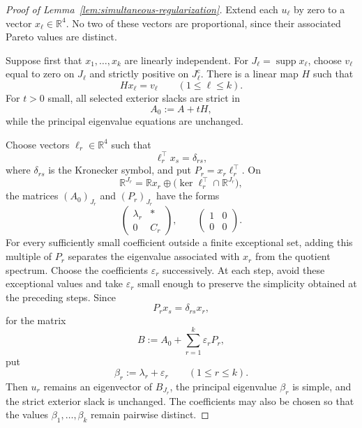 \documentclass[10pt,a4paper]{amsart}
\newcommand{\R}{\mathbb R}
\newcommand{\supp}{\operatorname{supp}}
\begin{document}
\begin{proof}[Proof of Lemma~\ref{lem:simultaneous-regularization}]
Extend each $u_\ell$ by zero to a vector $x_\ell\in\R^4$. No two of
these vectors are proportional, since their associated Pareto values
are distinct.

Suppose first that $x_1,\ldots,x_k$ are linearly independent. For
$J_\ell=\supp x_\ell$, choose $v_\ell$ equal to zero on $J_\ell$ and
strictly positive on $J_\ell^{\mathrm c}$. There is a linear map $H$
such that
$$
Hx_\ell=v_\ell
\qquad
(1\leq\ell\leq k).
$$
For $t>0$ small, all selected exterior slacks are strict in
$$
A_0:=A+tH,
$$
while the principal eigenvalue equations are unchanged.

Choose vectors $\ell_r\in\R^4$ such that
$$
\ell_r^\top x_s=\delta_{rs},
$$
where $\delta_{rs}$ is the Kronecker symbol, and put
$P_r=x_r\ell_r^\top$. On
$$
\R^{J_r}
=
\R x_r\oplus\bigl(\ker\ell_r^\top\cap\R^{J_r}\bigr),
$$
the matrices $(A_0)_{J_r}$ and $(P_r)_{J_r}$ have the forms
$$
\begin{pmatrix}
\lambda_r&*\\
0&C_r
\end{pmatrix},
\qquad
\begin{pmatrix}
1&0\\
0&0
\end{pmatrix}.
$$
For every sufficiently small coefficient outside a finite exceptional
set, adding this multiple of $P_r$ separates the eigenvalue associated
with $x_r$ from the quotient spectrum. Choose the coefficients
$\varepsilon_r$ successively. At each step, avoid these exceptional
values and take $\varepsilon_r$ small enough to preserve the simplicity
obtained at the preceding steps. Since
$$
P_rx_s=\delta_{rs}x_r,
$$
for the matrix
$$
B:=A_0+\sum_{r=1}^k\varepsilon_rP_r,
$$
put
$$
\beta_r:=\lambda_r+\varepsilon_r
\qquad
(1\leq r\leq k).
$$
Then $u_r$ remains an eigenvector of $B_{J_r}$, the principal
eigenvalue $\beta_r$ is simple, and the strict exterior slack is
unchanged. The coefficients may also be chosen so that the values
$\beta_1,\ldots,\beta_k$ remain pairwise distinct.


\end{proof}
\end{document}
